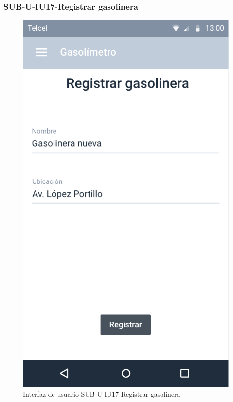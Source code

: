 \subsubsection{SUB-U-IU17-Registrar gasolinera}\label{SUB-U-IU17}
\begin{figure}[H]
	\centering
	\includegraphics[scale=1]{Capitulo4/software/submodulos/usuarios/images/sub-u-iu17}
	\caption{Interfaz de usuario SUB-U-IU17-Registrar gasolinera}
	\label{fig:sub-u-iu17}
\end{figure}
